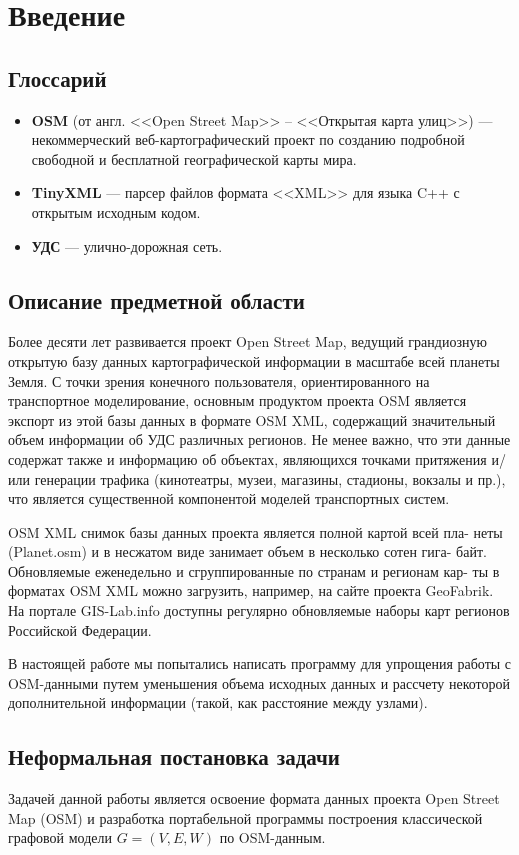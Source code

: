 \chapter*{Введение}
\section{Глоссарий}
\begin{itemize}
  \item \textbf{OSM} (от англ. <<Open Street Map>> -- <<Открытая карта улиц>>) --- некоммерческий веб-картографический проект по созданию подробной свободной и бесплатной географической карты мира.
  \item \textbf{TinyXML} --- парсер файлов формата <<XML>> для языка C++ с открытым исходным кодом.
  \item \textbf{УДС} --- улично-дорожная сеть.
\end{itemize}

\section{Описание предметной области}
\noindent\indent Более десяти лет развивается проект Open Street Map,
ведущий грандиозную открытую базу данных картографической информации в масштабе
всей планеты Земля. С точки зрения конечного пользователя, ориентированного на
транспортное моделирование, основным продуктом проекта OSM является экспорт из
этой базы данных в формате OSM XML, содержащий значительный объем информации об
УДС различных регионов. Не менее важно, что эти данные содержат также и информацию
об объектах, являющихся точками притяжения и/или генерации трафика (кинотеатры,
музеи, магазины, стадионы, вокзалы и пр.), что является существенной компонентой
моделей транспортных систем.\par
  OSM XML снимок базы данных проекта является полной картой всей пла-
неты (Planet.osm) и в несжатом виде занимает объем в несколько сотен гига-
байт. Обновляемые еженедельно и сгруппированные по странам и регионам кар-
ты в форматах OSM XML можно загрузить, например, на сайте проекта GeoFabrik.
На портале GIS-Lab.info доступны регулярно обновляемые наборы карт
регионов Российской Федерации.\par
  В настоящей работе мы попытались написать программу для упрощения
работы с OSM-данными путем уменьшения объема исходных данных и рассчету некоторой
дополнительной информации (такой, как расстояние между узлами).
\section{Неформальная постановка задачи}
\noindent\indent Задачей данной работы является освоение формата данных проекта
Open Street Map (OSM) и разработка портабельной программы построения классической
графовой модели $G = (V, E, W)$ по OSM-данным.
